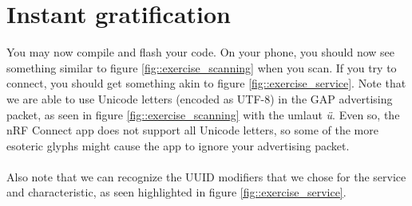 \documentclass[11pt,a4paper]{article}
\begin{document}
\section{Instant gratification}
You may now compile and flash your code. On your phone, you should now see something similar to figure \ref{fig::exercise_scanning} when you scan. If you try to connect, you should get something akin to figure \ref{fig::exercise_service}. Note that we are able to use Unicode letters (encoded as UTF-8) in the GAP advertising packet, as seen in figure \ref{fig::exercise_scanning} with the umlaut \textit{ü}. Even so, the nRF Connect app does not support all Unicode letters, so some of the more esoteric glyphs might cause the app to ignore your advertising packet.\\
\\
Also note that we can recognize the UUID modifiers that we chose for the service and characteristic, as seen highlighted in figure \ref{fig::exercise_service}.\\
\\
\end{document}
